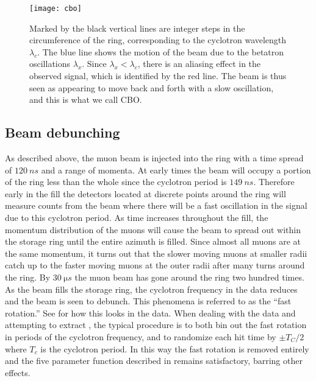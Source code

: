 \begin{figure}[]
    \centering
    \texttt{[image: cbo]}
    \caption[Coherent betatron oscillation]{Marked by the black vertical lines are integer steps in the circumference of the ring, corresponding to the cyclotron wavelength $\lambda_{c}$. The blue line shows the motion of the beam due to the betatron oscillations $\lambda_{x}$. Since $\lambda_{x} < \lambda_{c}$, there is an aliasing effect in the observed signal, which is identified by the red line. The beam is thus seen as appearing to move back and forth with a slow oscillation, and this is what we call CBO.}
    \label{fig:cbo}
\end{figure}


\subsection{Beam debunching}

As described above, the muon beam is injected into the ring with a time spread of $\SI{120}{ns}$ and a range of momenta. At early times the beam will occupy a portion of the ring less than the whole since the cyclotron period is $\SI{149}{ns}$. Therefore early in the fill the detectors located at discrete points around the ring will measure counts from the beam where there will be a fast oscillation in the signal due to this cyclotron period. As time increases throughout the fill, the momentum distribution of the muons will cause the beam to spread out within the storage ring until the entire azimuth is filled. Since almost all muons are at the same momentum, it turns out that the slower moving muons at smaller radii catch up to the faster moving muons at the outer radii after many turns around the ring. By $\SI{30}{\micro s}$ the muon beam has gone around the ring two hundred times. As the beam fills the storage ring, the cyclotron frequency in the data reduces and the beam is seen to debunch. This phenomena is referred to as the ``fast rotation.'' See  for how this looks in the data. When dealing with the data and attempting to extract \wa, the typical procedure is to both bin out the fast rotation in periods of the cyclotron frequency, and to randomize each hit time by $\pm T_{C}/2$ where $T_{c}$ is the cyclotron period. In this way the fast rotation is removed entirely and the five parameter function described in  remains satisfactory, barring other effects. 

